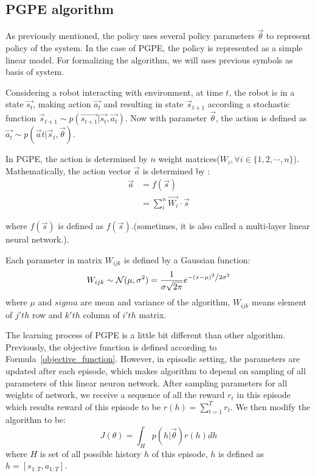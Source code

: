 \documentclass[officiallayout]{tktla}
\begin{document}
\subsection{PGPE algorithm}
As previously mentioned, the policy uses several policy parameters $\vec{\theta}$ to represent policy of the system. In the case of PGPE, the policy is represented as a simple linear model. For formalizing the algorithm, we will uses previous symbols as basis of system.

Considering a robot interacting with environment, at time $t$, the robot is in a state $\vec{s_t}$, making action $\vec{a_t}$ and resulting in state $\vec{s}_{t+1}$ according a stochastic function $\vec{s}_{t+1}\sim p(\vec{s_{t+1}}|\vec{s_t}, \vec{a_t})$. Now with parameter $\vec{\theta}$, the action is defined as $ \vec{a_{t}}\sim p(\vec{a}{t}|\vec{s}_{t},\vec{\theta})$.

In PGPE, the action is determined by $n$ weight matrices($W_i, \forall i \in \{1,2,\cdots, n\}$). Mathematically, the action vector $\vec{a}$ is determined by :
\begin{align}
\vec{a} &= f(\vec{s}) \\
&= \sum_i^n\vec{W_i} \cdot \vec{s}
\end{align}

where $f(\vec{s})$ is defined as $f(\vec{s})$.(sometimes, it is also called a multi-layer linear neural network.).

Each parameter in matrix $W_{ijk}$ is defined by a Gaussian function:
\begin{equation}
W_{ijk} \sim \mathcal{N}(\mu, \sigma^2) = \frac{1}{{\sigma \sqrt {2\pi } }}e^{{{ - \left( {x - \mu } \right)^2 } \mathord{\left/ {\vphantom {{ - \left( {x - \mu } \right)^2 } {2\sigma ^2 }}} \right. \kern-\nulldelimiterspace} {2\sigma ^2 }}}
\label{pgpe_gaussian}
\end{equation}
where $\mu$ and $sigma$ are mean and variance of the algorithm, $W_{ijk}$ means element of $j'th$ row and $k'th$ column of $i'th$ matrix.



The learning process of PGPE is a little bit different than other algorithm. Previously, the objective function is defined according to Formula~\ref{objective_function}. However, in episodic setting, the parameters are updated after each episode, which makes algorithm to depend on sampling of all parameters of this linear neuron network. After sampling parameters for all weights of network, we receive a sequence of all the reward $r_t$ in this episode which results reward of this episode to be $r(h) = \sum_{t=1}^T r_t$. We then modify the algorithm to be:
\begin{equation}
J(\theta) = \int_H p(h|\vec{\theta})r(h)dh
\end{equation}
where $H$ is set of all possible history $h$ of this episode, $h$ is defined as $h = [s_{1:T}, a_{1:T}]$.
\end{document}

